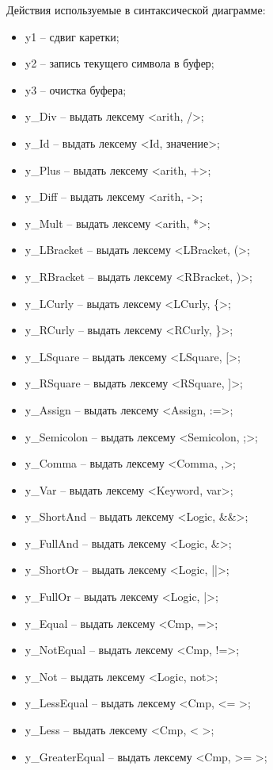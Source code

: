 \documentclass[a4paper,final]{article}
\begin{document}
Действия используемые в синтаксической диаграмме:
\begin{itemize}
    \item y1 -- сдвиг каретки;
    \item y2 -- запись текущего символа в буфер;
    \item y3 -- очистка буфера;
    \item y\_Div -- выдать лексему <arith, />;
    \item y\_Id -- выдать лексему <Id, значение>;
    \item y\_Plus -- выдать лексему <arith, +>;
    \item y\_Diff -- выдать лексему <arith, ->;
    \item y\_Mult -- выдать лексему <arith, *>;
    \item y\_LBracket -- выдать лексему <LBracket, (>;
    \item y\_RBracket -- выдать лексему <RBracket, )>;
    \item y\_LCurly -- выдать лексему <LCurly, \{>;
    \item y\_RCurly -- выдать лексему <RCurly, \}>;
    \item y\_LSquare -- выдать лексему <LSquare, [>;
    \item y\_RSquare -- выдать лексему <RSquare, ]>;
    \item y\_Assign -- выдать лексему <Assign, :=>;
    \item y\_Semicolon -- выдать лексему <Semicolon, ;>;
    \item y\_Comma -- выдать лексему <Comma, ,>;
    \item y\_Var -- выдать лексему <Keyword, var>;
    \item y\_ShortAnd -- выдать лексему <Logic, \&\&>;
    \item y\_FullAnd -- выдать лексему <Logic, \&>;
    \item y\_ShortOr -- выдать лексему <Logic, ||>;
    \item y\_FullOr -- выдать лексему <Logic, |>;
    \item y\_Equal -- выдать лексему <Cmp, =>;
    \item y\_NotEqual -- выдать лексему <Cmp, !=>;
    \item y\_Not -- выдать лексему <Logic, not>;
    \item y\_LessEqual -- выдать лексему <Cmp, <= >;
    \item y\_Less -- выдать лексему <Cmp, < >;
    \item y\_GreaterEqual -- выдать лексему <Cmp, >= >;

\end{itemize}
\end{document}
